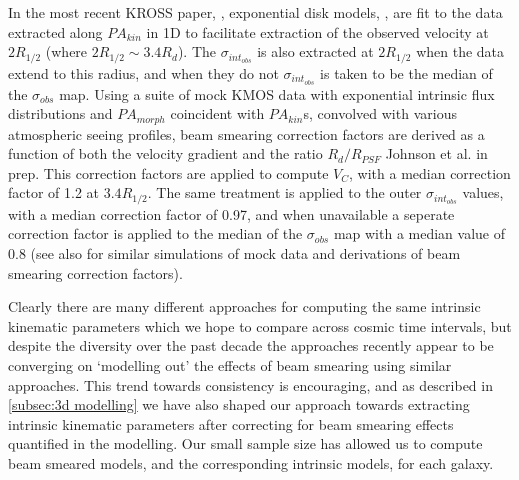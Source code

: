 \documentclass[fleqn,usenatbib]{mn2e}
\begin{document}
In the most recent KROSS paper, \citep{Harrison2017}, exponential disk models, \cite{Freeman1970}, are fit to the data extracted along $PA_{kin}$ in 1D to facilitate extraction of the observed velocity at $2R_{1/2}$ (where $2R_{1/2} \sim 3.4R_{d}$).
The $\sigma_{int_{obs}}$ is also extracted at $2R_{1/2}$ when the data extend to this radius, and when they do not $\sigma_{int_{obs}}$ is taken to be the median of the $\sigma_{obs}$ map.
Using a suite of mock KMOS data with exponential intrinsic flux distributions and $PA_{morph}$ coincident with $PA_{kin}$s, convolved with various atmospheric seeing profiles, beam smearing correction factors are derived as a function of both the velocity gradient and the ratio $R_{d}/R_{PSF}$ Johnson et al. in prep.
This correction factors are applied to compute $V_{C}$, with a median correction factor of 1.2 at $3.4R_{1/2}$.
The same treatment is applied to the outer $\sigma_{int_{obs}}$ values, with a median correction factor of 0.97, and when unavailable a seperate correction factor is applied to the median of the $\sigma_{obs}$ map with a median value of 0.8 (see also \citep{Burkert2016a} for similar simulations of mock data and derivations of beam smearing correction factors).

Clearly there are many different approaches for computing the same intrinsic kinematic parameters which we hope to compare across cosmic time intervals, but despite the diversity over the past decade the approaches recently appear to be converging on `modelling out' the effects of beam smearing using similar approaches.
This trend towards consistency is encouraging, and as described in \cref{subsec:3d modelling} we have also shaped our approach towards extracting intrinsic kinematic parameters after correcting for beam smearing effects quantified in the modelling.
Our small sample size has allowed us to compute beam smeared models, and the corresponding intrinsic models, for each galaxy.
\end{document}

